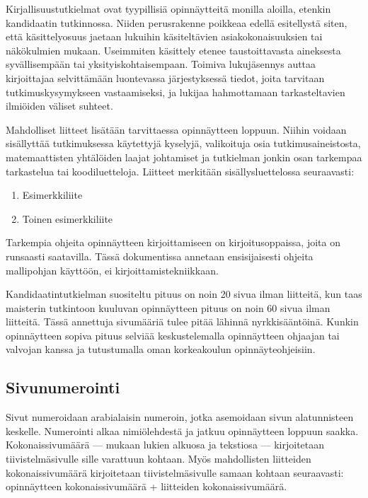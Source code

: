 \documentclass[finnish, 12pt, a4paper, elec, utf8, a-2b, online]{aaltothesis}
\begin{document}
Kirjallisuustutkielmat ovat tyypillisiä opinnäytteitä monilla aloilla, etenkin 
kandidaatin tutkinnossa. Niiden perusrakenne poikkeaa edellä esitellystä siten, 
että käsittelyosuus jaetaan lukuihin käsiteltävien asiakokonaisuuksien tai 
näkökulmien mukaan. Useimmiten käsittely etenee taustoittavasta aineksesta 
syvällisempään tai yksityiskohtaisempaan. Toimiva lukujäsennys auttaa 
kirjoittajaa selvittämään luontevassa järjestyksessä tiedot, joita tarvitaan 
tutkimuskysymykseen vastaamiseksi, ja lukijaa hahmottamaan tarkasteltavien 
ilmiöiden väliset suhteet.

Mahdolliset liitteet lisätään tarvittaessa opinnäytteen loppuun. Niihin voidaan 
sisällyttää tutkimuksessa käytettyjä kyselyjä, valikoituja osia 
tutkimusaineistosta, matemaattisten yhtälöiden laajat johtamiset ja tutkielman 
jonkin osan tarkempaa tarkastelua tai koodiluetteloja. Liitteet merkitään 
sisällysluettelossa seuraavasti:
\begin{enumerate}
	\renewcommand{\labelenumi}{\Alph{enumi}.}
	\item Esimerkkiliite
	\item Toinen esimerkkiliite
\end{enumerate}

Tarkempia ohjeita opinnäytteen kirjoittamiseen on kirjoitusoppaissa, joita on 
runsaasti saatavilla. Tässä dokumentissa annetaan ensisijaisesti ohjeita 
mallipohjan käyttöön, ei kirjoittamistekniikkaan. 

Kandidaatintutkielman suositeltu pituus on noin 20 sivua ilman liitteitä, kun 
taas maisterin tutkintoon kuuluvan opinnäytteen pituus on noin 60 sivua ilman 
liitteitä. Tässä annettuja sivumääriä tulee pitää lähinnä nyrkkisääntöinä. 
Kunkin opinnäytteen sopiva pituus selviää keskustelemalla opinnäytteen ohjaajan 
tai valvojan kanssa ja tutustumalla oman korkeakoulun opinnäyteohjeisiin.


\subsection{Sivunumerointi}

Sivut numeroidaan arabialaisin numeroin, jotka asemoidaan sivun alatunnisteen 
keskelle. Numerointi alkaa nimiölehdestä ja jatkuu opinnäytteen loppuun saakka. 
Kokonaissivumäärä --- mukaan lukien alkuosa ja tekstiosa --– kirjoitetaan 
tiivistelmäsivulle sille varattuun kohtaan. Myös mahdollisten liitteiden 
kokonaissivumäärä kirjoitetaan tiivistelmäsivulle samaan kohtaan seuraavasti: 
opinnäytteen kokonaissivumäärä + liitteiden kokonaissivumäärä.
\end{document}
